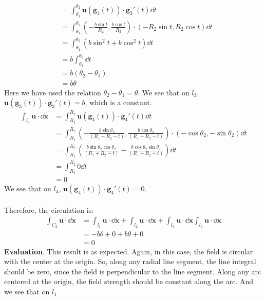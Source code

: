 \documentclass{article}
\begin{document}
\begin{enumerate}
\begin{enumerate}
\begin{align*}
       &= \int_{\theta_1}^{\theta_2} \mathbf{u}(\mathbf{g}_3(t))\cdot \mathbf{g}_3'(t) \dd t\\
       &= \int_{\theta_1}^{\theta_2} \left(-\frac{b\sin t}{R_2}, \frac{b\cos t}{R_2}\right) \cdot (-R_2 \sin t, R_2\cos t)\dd t\\
       &= \int_{\theta_1}^{\theta_2} \left(b\sin^2 t + b\cos^2 t\right) \dd t\\
       &= b\int_{\theta_1}^{\theta_2} \dd t\\
       &= b(\theta_2-\theta_1)\\
       &= b\theta
     \end{align*}
     Here we have used the relation \(\theta_2-\theta_1=\theta\). We see that on \(l_3\), \(\mathbf{u}(\mathbf{g}_3(t))\cdot \mathbf{g}_3'(t) = b\), which is a constant.
     \begin{align*}
       \int_{l_4} \mathbf{u}\cdot \dd\mathbf{x}
       &= \int_{R_1}^{R_2} \mathbf{u}(\mathbf{g}_4(t))\cdot \mathbf{g}_4'(t) \dd t\\
       &= \int_{R_1}^{R_2} \left(-\frac{b\sin\theta_2}{(R_1+R_2-t) }, \frac{b\cos\theta_2}{(R_1+R_2-t) }\right) \cdot
       (-\cos \theta_2, -\sin\theta_2) \dd t\\
       &= \int_{R_1}^{R_2}\left(\frac{b\sin\theta_2\cos \theta_2}{(R_1+R_2-t)} -\frac{b\cos\theta_2\sin\theta_2}{(R_1+R_2-t) }\right)
       \dd t\\
       &= \int_{R_1}^{R_2} 0 \dd t \\
       &= 0
     \end{align*}
      We see that on \(l_4\), \(\mathbf{u}(\mathbf{g}_4(t))\cdot \mathbf{g}_4'(t) = 0\).\\
      \\
      Therefore, the circulation is:
      \begin{align*}
        \int_{C_2} \mathbf{u}\cdot \dd\mathbf{x}
        &= \int_{l_1} \mathbf{u}\cdot \dd\mathbf{x} +\int_{l_2} \mathbf{u}\cdot \dd\mathbf{x} +\int_{l_3} \mathbf{u}\cdot \dd\mathbf{x}
        \int_{l_4} \mathbf{u}\cdot \dd\mathbf{x}\\
        &= -b\theta + 0 + b \theta + 0 \\
        &= 0
      \end{align*}
      \textbf{Evaluation}. This result is as expected. Again, in this case, the field is circular with the center at the origin.
      So, along any radial line segment, the line integral should be zero, since the field is perpendicular to the line segment. Along any arc centered at the origin, the field strength should be constant along the arc. And we see that on \(l_1\)

\end{enumerate}
\end{enumerate}
\end{document}
